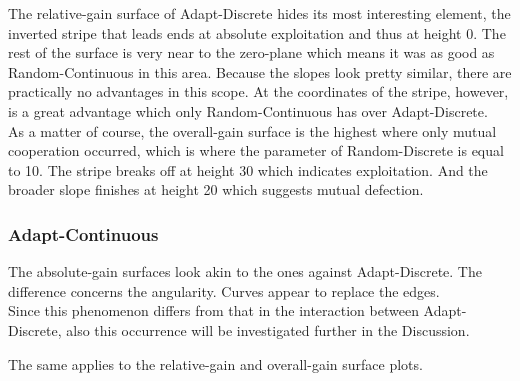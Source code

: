 \documentclass[11pt]{article}
\begin{document}
		The relative-gain surface of Adapt-Discrete hides its most interesting element, the inverted stripe that leads ends at absolute exploitation and thus at height 0.
		The rest of the surface is very near to the zero-plane which means it was as good as Random-Continuous in this area.
		Because the slopes look pretty similar, there are practically no advantages in this scope.
		At the coordinates of the stripe, however, is a great advantage which only Random-Continuous has over Adapt-Discrete.\\

		As a matter of course, the overall-gain surface is the highest where only mutual cooperation occurred, which is where the parameter of Random-Discrete is equal to 10.
		The stripe breaks off at height 30 which indicates exploitation.
		And the broader slope finishes at height 20 which suggests mutual defection.\\


\subsubsection*{Adapt-Continuous}
		The absolute-gain surfaces look akin to the ones against Adapt-Discrete.
		The difference concerns the angularity.
		Curves appear to replace the edges.\\
		Since this phenomenon differs from that in the interaction between Adapt-Discrete, also this occurrence will be investigated further in the Discussion.
		

		The same applies to the relative-gain and overall-gain surface plots.\\

	
\end{document}
